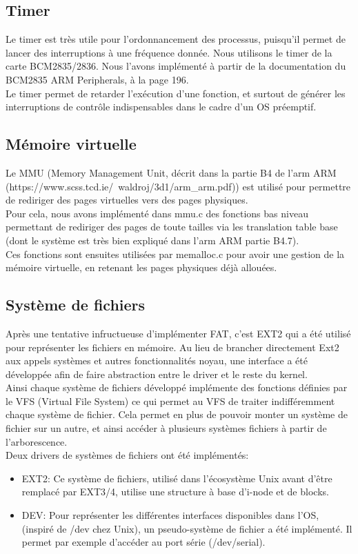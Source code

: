 \documentclass[a4paper]{article}
\begin{document}
\subsection{Timer}
Le timer est très utile pour l'ordonnancement des processus, puisqu'il permet de
lancer des interruptions à une fréquence donnée. Nous utilisons le timer de la
carte BCM2835/2836. Nous l'avons implémenté à partir de la documentation du
BCM2835 ARM Peripherals, à la page 196.\\

Le timer permet de retarder l'exécution d'une fonction, et surtout de générer
les interruptions de contrôle indispensables dans le cadre d'un OS préemptif.

\subsection{Mémoire virtuelle}

Le MMU (Memory Management Unit, décrit dans la partie B4 de l'arm ARM
(https://www.scss.tcd.ie/~waldroj/3d1/arm\_arm.pdf)) est utilisé pour permettre
de rediriger des pages virtuelles vers des pages physiques.\\

Pour cela, nous avons implémenté dans mmu.c des fonctions bas niveau permettant de
rediriger des pages de toute tailles via les translation table base (dont le
système est très bien expliqué dans l'arm ARM partie B4.7).\\

Ces fonctions sont ensuites utilisées par memalloc.c pour avoir une gestion de
la mémoire virtuelle, en retenant les pages physiques déjà allouées.

\subsection{Système de fichiers}
Après une tentative infructueuse d'implémenter FAT, c'est EXT2 qui a été utilisé
pour représenter les fichiers en mémoire.
Au lieu de brancher directement Ext2 aux appels systèmes et autres fonctionnalités
noyau, une interface a été développée afin de faire abstraction entre le driver
et le reste du kernel. \\
Ainsi chaque système de fichiers développé implémente des fonctions définies
par le VFS (Virtual File System) ce qui permet au VFS de traiter indifféremment
chaque système de fichier. Cela permet en plus de pouvoir monter un système de
fichier sur un autre, et ainsi accéder à plusieurs systèmes fichiers à partir de
l'arborescence. \\
Deux drivers de systèmes de fichiers ont été implémentés:
\begin{itemize}
	\item EXT2: Ce système de fichiers, utilisé dans l'écosystème Unix avant
	d'être remplacé par EXT3/4, utilise une structure à base d'i-node et de blocks.
	\item DEV: Pour représenter les différentes interfaces disponibles dans l'OS,
	(inspiré de /dev chez Unix), un pseudo-système de fichier a été implémenté.
	Il permet par exemple d'accéder au port série (/dev/serial).
\end{itemize}
\end{document}

